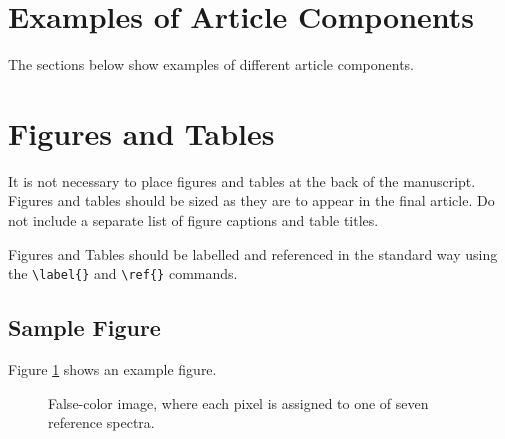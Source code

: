 \documentclass[9pt,twocolumn,twoside]{osajnl}
\begin{document}


\section{Examples of Article Components}
\label{sec:examples}

The sections below show examples of different article components.

\section{Figures and Tables}

It is not necessary to place figures and tables at the back of the manuscript. Figures and tables should be sized as they are to appear in the final article. Do not include a separate list of figure captions and table titles.

Figures and Tables should be labelled and referenced in the standard way using the \verb|\label{}| and \verb|\ref{}| commands.

\subsection{Sample Figure}

Figure \ref{fig:falsecolor} shows an example figure.

\begin{figure}[htbp]
\centering
{}
\caption{False-color image, where each pixel is assigned to one of seven reference spectra.}
\label{fig:falsecolor}
\end{figure}
\end{document}
